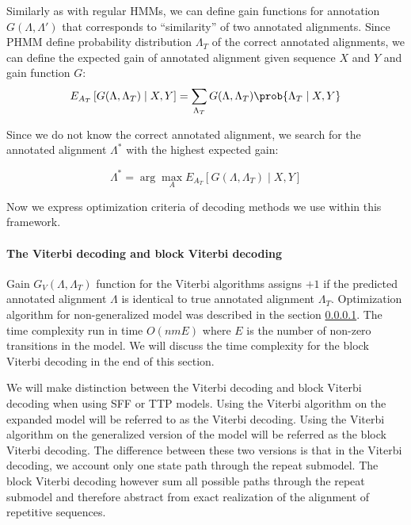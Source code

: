 Similarly as with regular HMMs, we can define gain functions for annotation
$G(\Lambda, \Lambda')$ that corresponds to ``similarity'' of two annotated
alignments.  Since PHMM define probability distribution $\Lambda_T$ of the
correct annotated alignments, we can define the expected gain of annotated
alignment given sequence $X$ and $Y$ and gain function $G$:
\begin{equation}
E_{A_T}\left[G(\Lambda, \Lambda_T)\mid X, Y\right] = 
\sum_{\Lambda_T}G(\Lambda, \Lambda_T)\prob{\Lambda_T\mid X, Y}
\end{equation}

Since we do not know the correct annotated alignment, we search for the
annotated alignment $\Lambda^*$ with the highest expected gain:

\begin{equation}
\Lambda^* = \arg\max_AE_{A_T}\left[G(\Lambda, \Lambda_T)\mid X, Y\right]
\end{equation}

Now we express optimization criteria of decoding methods we use within this
framework. 

\paragraph{The Viterbi decoding and block Viterbi decoding} Gain $G_V(\Lambda,
\Lambda_T)$ function for the Viterbi algorithms assigns $+1$ if the predicted
annotated alignment $\Lambda$ is identical to true annotated alignment
$\Lambda_T$. Optimization algorithm for non-generalized model was described in
the section \ref{}.  The time complexity run in time $O(nmE)$ where $E$ is the
number of non-zero transitions in the model.  We will discuss the time
complexity for the block Viterbi decoding in the end of this section.

We will make distinction between the Viterbi decoding and block Viterbi
decoding when using SFF or TTP models. Using the Viterbi algorithm on the
expanded model will be referred to as the Viterbi decoding. Using the Viterbi
algorithm on the generalized version of the model will be referred as the block
Viterbi decoding. The difference between these two versions is that in the
Viterbi decoding, we account only one state path through the repeat submodel.
The block Viterbi decoding however sum all possible paths through the repeat
submodel and therefore abstract from exact realization of the alignment of
repetitive sequences.

